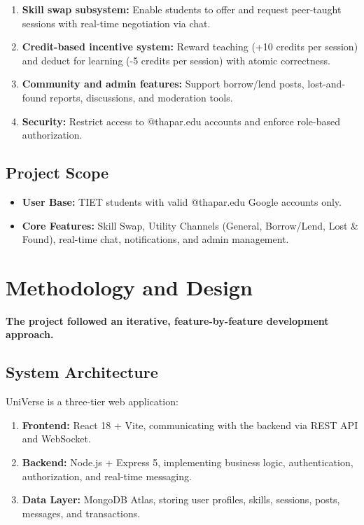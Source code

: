 \documentclass{tietreport}
\begin{document}
\begin{enumerate}
  \item \textbf{Skill swap subsystem:} Enable students to offer and request peer-taught sessions with real-time negotiation via chat.
  \item \textbf{Credit-based incentive system:} Reward teaching (+10 credits per session) and deduct for learning (-5 credits per session) with atomic correctness.
  \item \textbf{Community and admin features:} Support borrow/lend posts, lost-and-found reports, discussions, and moderation tools.
  \item \textbf{Security:} Restrict access to @thapar.edu accounts and enforce role-based authorization.
\end{enumerate}

\section{Project Scope}

\begin{itemize}
  \item \textbf{User Base:} TIET students with valid @thapar.edu Google accounts only.
  \item \textbf{Core Features:} Skill Swap, Utility Channels (General, Borrow/Lend, Lost \& Found), real-time chat, notifications, and admin management.
\end{itemize}


\chapter{Methodology and Design}

\item \textbf{The project followed an iterative, feature-by-feature development approach.}

\section{System Architecture}

UniVerse is a three-tier web application:

\begin{enumerate}
  \item \textbf{Frontend:} React 18 + Vite, communicating with the backend via REST API and WebSocket.
  \item \textbf{Backend:} Node.js + Express 5, implementing business logic, authentication, authorization, and real-time messaging.
  \item \textbf{Data Layer:} MongoDB Atlas, storing user profiles, skills, sessions, posts, messages, and transactions.
\end{enumerate}
\end{document}

